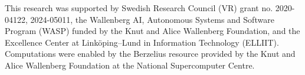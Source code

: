 This research was supported by 
Swedish Research Council (VR) grant no. 2020-04122, 2024-05011,
the Wallenberg AI, Autonomous Systems and Software Program (WASP) funded by the Knut and Alice Wallenberg Foundation,
and
the Excellence Center at Linköping--Lund in Information Technology (ELLIIT).
Computations were enabled by the Berzelius resource provided by the Knut and Alice Wallenberg Foundation at the National Supercomputer Centre.
